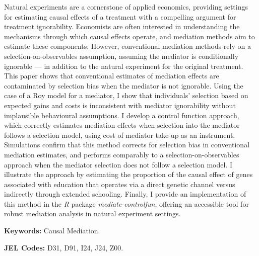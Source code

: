 \noindent
Natural experiments are a cornerstone of applied economics, providing settings for estimating causal effects of a treatment with a compelling argument for treatment ignorability.
Economists are often interested in understanding the mechanisms through which causal effects operate, and mediation methods aim to estimate these components.
However, conventional mediation methods rely on a selection-on-observables assumption, assuming the mediator is conditionally ignorable --- in addition to the natural experiment for the original treatment.
This paper shows that conventional estimates of mediation effects are contaminated by selection bias when the mediator is not ignorable.
Using the case of a Roy model for a mediator, I show that individuals' selection based on expected gains and costs is inconsistent with mediator ignorability without implausible behavioural assumptions.
I develop a control function approach, which correctly estimates mediation effects when selection into the mediator follows a selection model, using cost of mediator take-up as an instrument.
Simulations confirm that this method corrects for selection bias in conventional mediation estimates, and performs comparably to a selection-on-observables approach when the mediator selection does not follow a selection model.
I illustrate the approach by estimating the proportion of the causal effect of genes associated with education that operates via a direct genetic channel versus indirectly through extended schooling.
Finally, I provide an implementation of this method in the \textit{R} package \textit{mediate-controlfun}, offering an accessible tool for robust mediation analysis in natural experiment settings.

\vspace{0.5cm}
\noindent
\textbf{Keywords:}
Causal Mediation.

\vspace{0.1cm}
\noindent
\textbf{JEL Codes:}
D31, D91, I24, J24, Z00.
